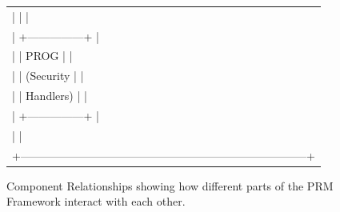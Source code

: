 \begin{figure}[htbp]
{{{\begin{tabular}{l}
|                                                 |                           | \\
|                                         +---------------+                   | \\
|                                         |  PROG         |                   | \\
|                                         |  (Security    |                   | \\
|                                         |   Handlers)   |                   | \\
|                                         +---------------+                   | \\
|                                                                             | \\
+-----------------------------------------------------------------------------+ \\
\end{tabular}
}
}}
\caption{Component Relationships showing how different parts of the PRM Framework interact with each other.}
\label{fig:components}
\end{figure}